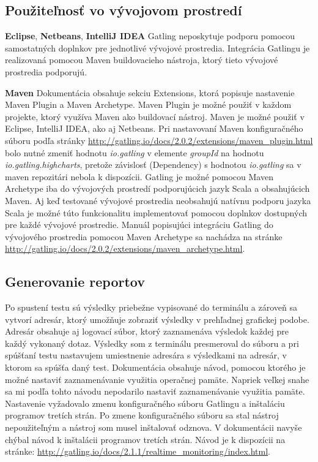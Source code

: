 \documentclass[12pt,oneside,final]{fithesis-utf8}
\begin{document}
\subsection{Použiteľnosť vo vývojovom prostredí}
\textbf{Eclipse}, \textbf{Netbeans}, \textbf{IntelliJ IDEA}
\newline
Gatling neposkytuje podporu pomocou samostatných doplnkov pre jednotlivé vývojové prostredia. Integrácia Gatlingu je realizovaná pomocou Maven buildovacieho nástroja, ktorý tieto vývojové prostredia podporujú.

\newpage
\noindent \textbf{Maven}
\newline
Dokumentácia obsahuje sekciu Extensions, ktorá popisuje nastavenie Maven Plugin a Maven Archetype.
\newline Maven Plugin je možné použiť v každom projekte, ktorý využíva Maven ako buildovací nástroj. Maven je možné použiť v Eclipse, IntelliJ IDEA, ako aj Netbeans. Pri nastavovaní Maven konfiguračného súboru podľa stránky \url{http://gatling.io/docs/2.0.2/extensions/maven_plugin.html} bolo nutné zmeniť hodnotu \textit{io.gatling} v elemente \textit{groupId} na hodnotu \textit{io.gatling.highcharts}, pretože závislosť (Dependency) s hodnotou \textit{io.gatling} sa v maven repozitári nebola k dispozícii.
\newline
\newline
Gatling je možné pomocou Maven Archetype iba do vývojových prostredí podporujúcich jazyk Scala a obsahujúcich Maven. Aj keď testované vývojové prostredia neobsahujú natívnu podporu jazyka Scala je možné túto funkcionalitu implementovať pomocou doplnkov dostupných pre každé vývojové prostredie. Manuál popisujúci integráciu Gatling do vývojového prostredia pomocou Maven Archetype sa nachádza na stránke \url{http://gatling.io/docs/2.0.2/extensions/maven_archetype.html}.
\newline

\subsection{Generovanie reportov}
Po spustení testu sú výsledky priebežne vypisované do terminálu a zároveň sa vytvorí adresár, ktorý umožňuje zobraziť výsledky v prehľadnej grafickej podobe. Adresár obsahuje aj logovací súbor, ktorý zaznamenáva výsledok každej pre každý vykonaný dotaz. Výsledky som z terminálu presmeroval do súboru a pri spúšťaní testu nastavujem umiestnenie adresára s výsledkami na adresár, v ktorom sa spúšťa daný test. Dokumentácia obsahuje návod, pomocou ktorého je možné nastaviť zaznamenávanie využitia operačnej pamäte. Napriek veľkej snahe sa mi podľa tohto návodu nepodarilo nastaviť zaznamenávanie využitia pamäte. Nastavenie vyžadovalo zmenu konfiguračného súboru Gatlingu a inštaláciu programov tretích strán. Po zmene konfiguračného súboru sa stal nástroj nepoužiteľným a nástroj som musel inštalovať odznova. V dokumentácii navyše chýbal návod k inštalácii programov tretích strán. Návod je k dispozícii na stránke: \url{http://gatling.io/docs/2.1.1/realtime_monitoring/index.html}.
\end{document}
